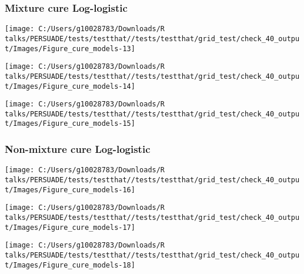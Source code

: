 \documentclass[
]{article}
\begin{document}
\clearpage

\subsubsection{Mixture cure
Log-logistic}\label{mixture-cure-log-logistic}

\begin{flushleft}\texttt{[image: C:/Users/g10028783/Downloads/R talks/PERSUADE/tests/testthat//tests/testthat/grid\_test/check\_40\_output/Images/Figure\_cure\_models-13]} \end{flushleft}

\begin{flushleft}\texttt{[image: C:/Users/g10028783/Downloads/R talks/PERSUADE/tests/testthat//tests/testthat/grid\_test/check\_40\_output/Images/Figure\_cure\_models-14]} \end{flushleft}

\begin{flushleft}\texttt{[image: C:/Users/g10028783/Downloads/R talks/PERSUADE/tests/testthat//tests/testthat/grid\_test/check\_40\_output/Images/Figure\_cure\_models-15]} \end{flushleft}

\clearpage

\subsubsection{Non-mixture cure
Log-logistic}\label{non-mixture-cure-log-logistic}

\begin{flushleft}\texttt{[image: C:/Users/g10028783/Downloads/R talks/PERSUADE/tests/testthat//tests/testthat/grid\_test/check\_40\_output/Images/Figure\_cure\_models-16]} \end{flushleft}

\begin{flushleft}\texttt{[image: C:/Users/g10028783/Downloads/R talks/PERSUADE/tests/testthat//tests/testthat/grid\_test/check\_40\_output/Images/Figure\_cure\_models-17]} \end{flushleft}

\begin{flushleft}\texttt{[image: C:/Users/g10028783/Downloads/R talks/PERSUADE/tests/testthat//tests/testthat/grid\_test/check\_40\_output/Images/Figure\_cure\_models-18]} \end{flushleft}
\end{document}
